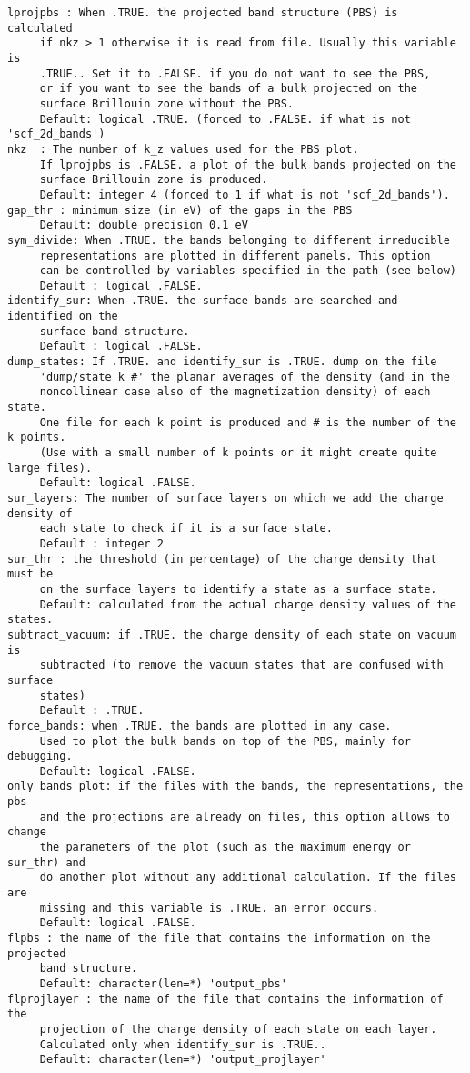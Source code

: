 \documentclass[12pt,a4paper]{article}
\begin{document}
\begin{verbatim}
lprojpbs : When .TRUE. the projected band structure (PBS) is calculated 
     if nkz > 1 otherwise it is read from file. Usually this variable is
     .TRUE.. Set it to .FALSE. if you do not want to see the PBS, 
     or if you want to see the bands of a bulk projected on the 
     surface Brillouin zone without the PBS.
     Default: logical .TRUE. (forced to .FALSE. if what is not 'scf_2d_bands')
nkz  : The number of k_z values used for the PBS plot. 
     If lprojpbs is .FALSE. a plot of the bulk bands projected on the 
     surface Brillouin zone is produced.
     Default: integer 4 (forced to 1 if what is not 'scf_2d_bands').
gap_thr : minimum size (in eV) of the gaps in the PBS
     Default: double precision 0.1 eV
sym_divide: When .TRUE. the bands belonging to different irreducible 
     representations are plotted in different panels. This option
     can be controlled by variables specified in the path (see below)
     Default : logical .FALSE.
identify_sur: When .TRUE. the surface bands are searched and identified on the
     surface band structure. 
     Default : logical .FALSE.
dump_states: If .TRUE. and identify_sur is .TRUE. dump on the file 
     'dump/state_k_#' the planar averages of the density (and in the 
     noncollinear case also of the magnetization density) of each state. 
     One file for each k point is produced and # is the number of the k points.
     (Use with a small number of k points or it might create quite large files).
     Default: logical .FALSE.
sur_layers: The number of surface layers on which we add the charge density of 
     each state to check if it is a surface state.
     Default : integer 2
sur_thr : the threshold (in percentage) of the charge density that must be
     on the surface layers to identify a state as a surface state.
     Default: calculated from the actual charge density values of the states.
subtract_vacuum: if .TRUE. the charge density of each state on vacuum is
     subtracted (to remove the vacuum states that are confused with surface
     states)
     Default : .TRUE.
force_bands: when .TRUE. the bands are plotted in any case.
     Used to plot the bulk bands on top of the PBS, mainly for debugging.
     Default: logical .FALSE.
only_bands_plot: if the files with the bands, the representations, the pbs
     and the projections are already on files, this option allows to change
     the parameters of the plot (such as the maximum energy or sur_thr) and
     do another plot without any additional calculation. If the files are
     missing and this variable is .TRUE. an error occurs.
     Default: logical .FALSE.
flpbs : the name of the file that contains the information on the projected
     band structure.
     Default: character(len=*) 'output_pbs'
flprojlayer : the name of the file that contains the information of the
     projection of the charge density of each state on each layer.
     Calculated only when identify_sur is .TRUE..
     Default: character(len=*) 'output_projlayer'
\end{verbatim}
\end{document}

